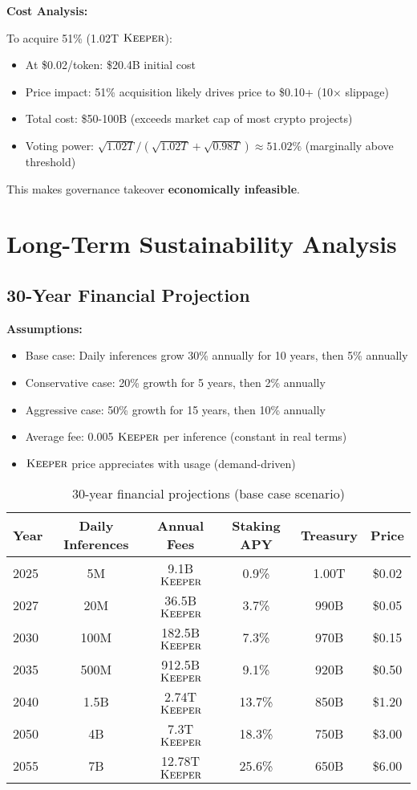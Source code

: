 \documentclass[11pt,letterpaper]{article}
\theoremstyle{definition}
\theoremstyle{remark}
\newcommand{\KEEPER}{\textsc{Keeper}}
\begin{document}
\textbf{Cost Analysis:}

To acquire 51\% (1.02T $\KEEPER$):
\begin{itemize}
\item At \$0.02/token: \$20.4B initial cost
\item Price impact: 51\% acquisition likely drives price to \$0.10+ (10× slippage)
\item Total cost: \$50-100B (exceeds market cap of most crypto projects)
\item Voting power: $\sqrt{1.02T} / (\sqrt{1.02T} + \sqrt{0.98T}) \approx 51.02\%$ (marginally above threshold)
\end{itemize}

This makes governance takeover \textbf{economically infeasible}.

\section{Long-Term Sustainability Analysis}

\subsection{30-Year Financial Projection}

\textbf{Assumptions:}
\begin{itemize}
\item Base case: Daily inferences grow 30\% annually for 10 years, then 5\% annually
\item Conservative case: 20\% growth for 5 years, then 2\% annually
\item Aggressive case: 50\% growth for 15 years, then 10\% annually
\item Average fee: 0.005 $\KEEPER$ per inference (constant in real terms)
\item $\KEEPER$ price appreciates with usage (demand-driven)
\end{itemize}

\begin{table}[h]
\centering
\small
\begin{tabular}{lccccc}
\toprule
\textbf{Year} & \textbf{Daily Inferences} & \textbf{Annual Fees} & \textbf{Staking APY} & \textbf{Treasury} & \textbf{Price} \\
\midrule
2025 & 5M & 9.1B $\KEEPER$ & 0.9\% & 1.00T & \$0.02 \\
2027 & 20M & 36.5B $\KEEPER$ & 3.7\% & 990B & \$0.05 \\
2030 & 100M & 182.5B $\KEEPER$ & 7.3\% & 970B & \$0.15 \\
2035 & 500M & 912.5B $\KEEPER$ & 9.1\% & 920B & \$0.50 \\
2040 & 1.5B & 2.74T $\KEEPER$ & 13.7\% & 850B & \$1.20 \\
2050 & 4B & 7.3T $\KEEPER$ & 18.3\% & 750B & \$3.00 \\
2055 & 7B & 12.78T $\KEEPER$ & 25.6\% & 650B & \$6.00 \\
\bottomrule
\end{tabular}
\caption{30-year financial projections (base case scenario)}
\label{tab:projections}
\end{table}
\end{document}
